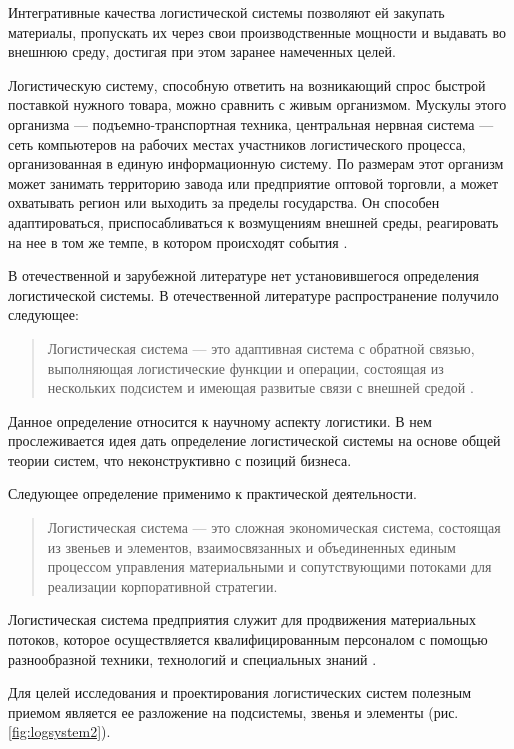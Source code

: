 Интегративные качества логистической системы позволяют ей закупать материалы, пропускать их через свои производственные мощности и выдавать во внешнюю среду, достигая при этом заранее намеченных целей.

Логистическую систему, способную ответить на возни­кающий спрос быстрой поставкой нужного товара, можно сравнить с живым организмом.
Мускулы этого организма --- подъемно-транспортная техника, центральная нервная си­стема --- сеть компьютеров на рабочих местах участников логистического процесса, организованная в единую инфор­мационную систему.
По размерам этот организм может за­нимать территорию завода или предприятие оптовой тор­говли, а может охватывать регион или выходить за преде­лы государства.
Он способен адаптироваться, приспосабли­ваться к возмущениям внешней среды, реагировать на нее в том же темпе, в котором происходят события \cite[с.84--87]{gadzhinskiy}.

В отечественной и зарубежной литературе нет установившегося определения логистической системы.
В  отечественной литературе распространение получило следующее:

\begin{quote}
	Логистическая система --- это адаптивная система с обратной связью, выполняющая логистические функции и операции, состоящая из нескольких подсистем и имеющая развитые связи с внешней средой \cite[с. 120]{rodnikov}.
\end{quote}

Данное определение относится к научному аспекту логистики.
В нем прослеживается идея дать определение логистической системы на основе общей теории систем, что неконструктивно с позиций бизнеса.

Следующее определение применимо к практической деятельности.

\begin{quote}
	Логистическая система --- это сложная экономическая система, состоящая из звеньев и элементов, взаимосвязанных и объединенных единым процессом управления материальными и сопутствующими потоками для реализации корпоративной стратегии.
\end{quote}

Логистическая система предприятия служит для продвижения материальных потоков, которое осуществляется квалифицированным персоналом с помощью разнообразной техники, технологий и специальных знаний \cites[с.116]{levkin}[с. 15--16]{sergeev}.

Для целей исследования и проектирования логистических систем полезным приемом является ее разложение на подсистемы, звенья и элементы (рис. \ref{fig:logsystem2}).


